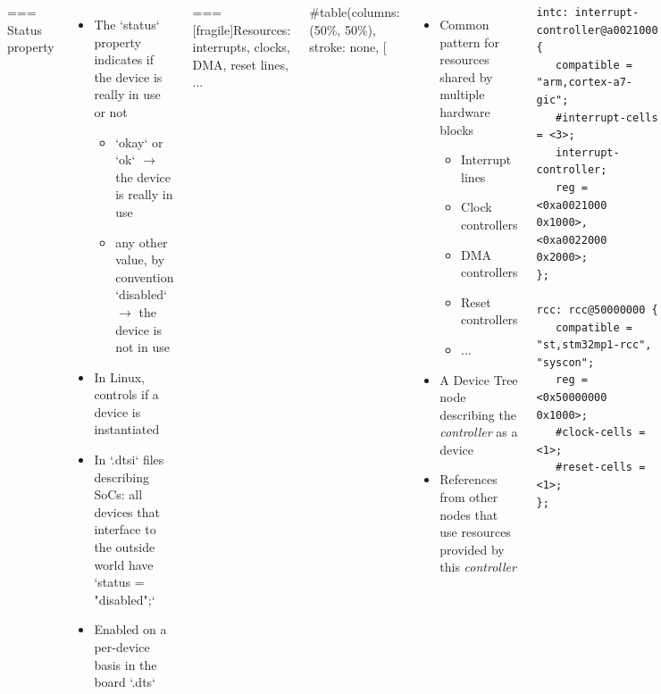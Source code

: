 \begin{columns}[t]
\begin{columns}[t]
\begin{columns}[t]
\begin{columns}[t]
=== {Status property}
  \begin{itemize}
  \item The `status` property indicates if the device is really in
    use or not
    \begin{itemize}
    \item `okay` or `ok` $\rightarrow$ the device is really
      in use
    \item any other value, by convention `disabled` $\rightarrow$
      the device is not in use
    \end{itemize}
  \item In Linux, controls if a device is instantiated
  \item In `.dtsi` files describing SoCs: all devices that
    interface to the outside world have `status = "disabled";`
  \item Enabled on a per-device basis in the board `.dts`
  \end{itemize}


=== [fragile]{Resources: interrupts, clocks, DMA, reset lines, ...}
  
#table(columns: (50\%, 50\%), stroke: none,
[
  \begin{itemize}
  \item Common pattern for resources shared by multiple hardware
    blocks
    \begin{itemize}
    \item Interrupt lines
    \item Clock controllers
    \item DMA controllers
    \item Reset controllers
    \item ...
    \end{itemize}
  \item A Device Tree node describing the {\em controller} as a device
  \item References from other nodes that use resources provided by
    this {\em controller}
  \end{itemize}
\begin{block}{}
{\tiny
\begin{verbatim}
intc: interrupt-controller@a0021000 {
   compatible = "arm,cortex-a7-gic";
   #interrupt-cells = <3>;
   interrupt-controller;
   reg = <0xa0021000 0x1000>, <0xa0022000 0x2000>;
};

rcc: rcc@50000000 {
   compatible = "st,stm32mp1-rcc", "syscon";
   reg = <0x50000000 0x1000>;
   #clock-cells = <1>;
   #reset-cells = <1>;
};


\end{verbatim}}
\end{block}
\end{columns}
\end{columns}
\end{columns}
\end{columns}
